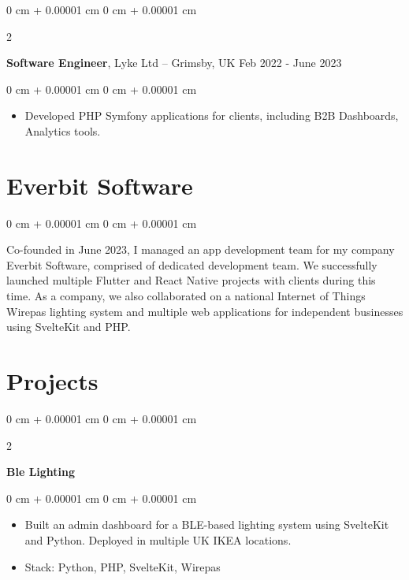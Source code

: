 \documentclass[10pt, letterpaper]{article}
\newenvironment{highlights}{
    \begin{itemize}[
        topsep=0.10 cm,
        parsep=0.10 cm,
        partopsep=0pt,
        itemsep=0pt,
        leftmargin=0 cm + 10pt
    ]
}{
    \end{itemize}
} %
\newenvironment{onecolentry}{
    \begin{adjustwidth}{
        0 cm + 0.00001 cm
    }{
        0 cm + 0.00001 cm
    }
}{
    \end{adjustwidth}
} %
\newenvironment{twocolentry}[2][]{
    \onecolentry
    \def\secondColumn{#2}
    \setcolumnwidth{\fill, 4.5 cm}
    \begin{paracol}{2}
}{
    \switchcolumn \raggedleft \secondColumn
    \end{paracol}
    \endonecolentry
} %
\begin{document}
        \begin{twocolentry}{
            Feb 2022 - June 2023
        }
            \textbf{Software Engineer}, Lyke Ltd -- Grimsby, UK\end{twocolentry}

        \vspace{0.10 cm}
        \begin{onecolentry}
            \begin{highlights}
                \item Developed PHP Symfony applications for clients, including B2B Dashboards, Analytics tools.
            \end{highlights}
        \end{onecolentry}

    \section{Everbit Software}
        
        \begin{onecolentry}
            Co-founded in June 2023, I managed an app development team for my company Everbit Software, comprised of dedicated development team. We successfully launched multiple Flutter and React Native projects with clients during this time. As a company, we also collaborated on a national Internet of Things Wirepas lighting system and multiple web applications for independent businesses using SvelteKit and PHP.
        \end{onecolentry}
    
    \section{Projects}

        \begin{twocolentry}{}
            \textbf{Ble Lighting}\end{twocolentry}

        \vspace{0.10 cm}
        \begin{onecolentry}
            \begin{highlights}
                \item Built an admin dashboard for a BLE-based lighting system using SvelteKit and Python. Deployed in multiple UK IKEA locations.
                \item Stack: Python, PHP, SvelteKit, Wirepas
            \end{highlights}
        \end{onecolentry}
\end{document}
